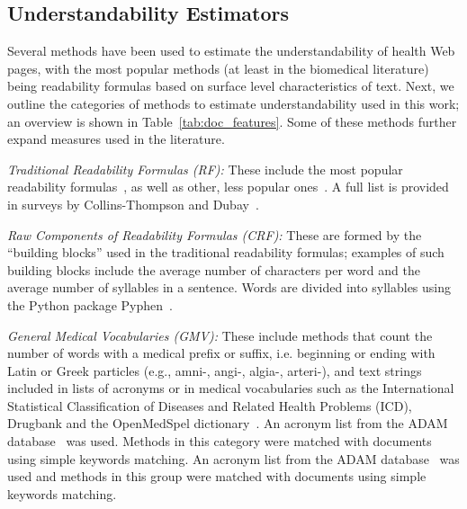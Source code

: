 
\subsection*{Understandability Estimators}
\label{sec:proxies}

Several methods have been used to estimate the understandability of health Web pages, with the most popular methods (at least in the biomedical literature) being readability formulas based on surface level characteristics of text. Next, we outline the categories of methods to estimate understandability used in this work; an overview is shown in Table~\ref{tab:doc_features}. Some of these methods further expand measures used in the literature. 
 


\textit{Traditional Readability Formulas (RF):}
These include the most popular readability formulas~\cite{cli75,dale48,flesch75}, as well as other, less popular ones~\cite{ari67,gunning52,lix,smog69}. A full list is provided in surveys by Collins-Thompson \cite{collins2014computational} and Dubay~\cite{dubay04}.

\textit{Raw Components of Readability Formulas (CRF):}
These are formed by the ``building blocks'' used in the traditional readability formulas; examples of such building blocks include the average number of characters per word and the average number of syllables in a sentence. Words are divided into syllables using the Python package Pyphen~\cite{pyphen}.

\textit{General Medical Vocabularies (GMV):}
These include methods that count the number of words with a medical prefix or suffix, i.e. beginning or ending with Latin or Greek particles (e.g., amni-, angi-, algia-, arteri-), and text strings included in lists of acronyms or in medical vocabularies such as the International Statistical Classification of Diseases and Related Health Problems (ICD), Drugbank and the OpenMedSpel dictionary~\cite{openmedspel}. An acronym list from the ADAM database~\cite{zhou2006} was used. Methods in this category were matched with documents using simple keywords matching. An acronym list from the ADAM database~\cite{zhou2006} was used and methods in this group were matched with documents using simple keywords matching.


